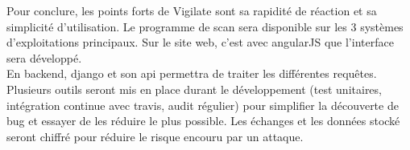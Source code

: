 Pour conclure, les points forts de Vigilate sont sa rapidité de réaction et sa simplicité d’utilisation. Le programme de scan sera disponible sur les 3 systèmes d’exploitations principaux. Sur le site web, c’est avec angularJS que l’interface sera développé.\\
En backend, django et son api permettra de traiter les différentes requêtes.
Plusieurs outils seront mis en place durant le développement (test unitaires, intégration continue avec travis, audit régulier) pour simplifier la découverte de bug et essayer de les réduire le plus possible. Les échanges et les données stocké seront chiffré pour réduire le risque encouru par un attaque.
